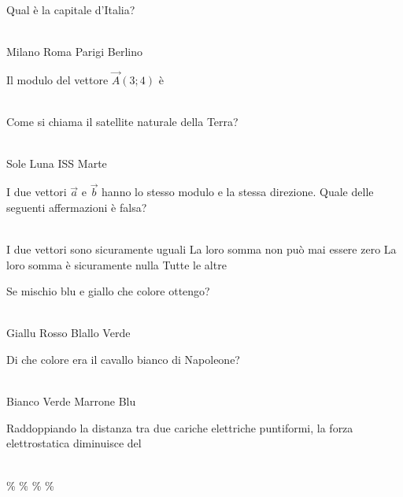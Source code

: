 \documentclass[a4paper,11pt]{exam}
\begin{document}
\begin{questions}
    
\question Qual è la capitale d’Italia?\\\
\begin{oneparchoices}
  \choice Milano
  \choice Roma
  \choice Parigi
  \choice Berlino
\end{oneparchoices}

    
\question Il modulo del vettore $\vec{A}(3;4)$ è\\\
\begin{oneparchoices}
  \choice 12
\end{oneparchoices}

    
\question Come si chiama il satellite naturale della Terra?\\\
\begin{oneparchoices}
  \choice Sole
  \choice Luna
  \choice ISS
  \choice Marte
\end{oneparchoices}

    
\question I due vettori $\vec{a}$ e $\vec{b}$ hanno lo stesso modulo e la stessa direzione. Quale delle seguenti affermazioni è falsa?\\\
\begin{oneparchoices}
  \choice I due vettori sono sicuramente uguali
  \choice La loro somma non può mai essere zero
  \choice La loro somma è sicuramente nulla
  \choice Tutte le altre
\end{oneparchoices}

    
\question Se mischio blu e giallo che colore ottengo?\\\
\begin{oneparchoices}
  \choice Giallu
  \choice Rosso
  \choice Blallo
  \choice Verde
\end{oneparchoices}

    
\question Di che colore era il cavallo bianco di Napoleone?\\\
\begin{oneparchoices}
  \choice Bianco
  \choice Verde
  \choice Marrone
  \choice Blu 
\end{oneparchoices}

    
\question Raddoppiando la distanza tra due cariche elettriche puntiformi, la forza elettrostatica diminuisce del\\\
\begin{oneparchoices}
  \choice 75\%
  \choice 90\%
  \choice 50\%
  \choice 25\%
\end{oneparchoices}

    
\end{questions}
\end{document}
